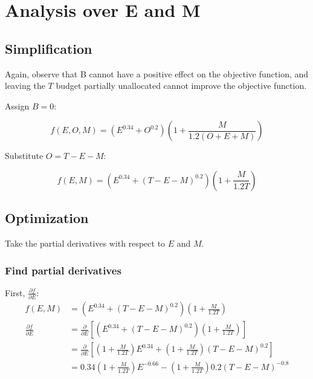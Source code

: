 \documentclass{article}
\begin{document}

\section{Analysis over E and M}

\subsection{Simplification}

Again, observe that B cannot have a positive effect on the objective function, and leaving the $T$ budget partially unallocated cannot improve the objective function.

Assign $B = 0$:

\[
f(E, O, M) = \left( E^{0.34} + O^{0.2} \right) \left( 1 + \frac{M}{1.2 \left( O + E + M \right)} \right)
\]

Substitute $O = T - E - M$:

\[
f(E, M) = \left( E^{0.34} + \left( T - E - M \right)^{0.2} \right) \left( 1 + \frac{M}{1.2 T} \right)
\]

\subsection{Optimization}

Take the partial derivatives with respect to $E$ and $M$.

\subsubsection{Find partial derivatives}

First, $\frac{\partial f}{\partial E}$:
\begin{equation}\label{eq:2dfde}
  \begin{aligned}
    f(E, M) & = \left( E^{0.34} + \left( T - E - M \right)^{0.2} \right) \left( 1 + \frac{M}{1.2 T} \right) \\
    \frac{\partial f}{\partial E} & = \frac{\partial}{\partial E}\left[\left( E^{0.34} + \left( T - E - M \right)^{0.2} \right) \left( 1 + \frac{M}{1.2 T} \right)\right] \\
    & = \frac{\partial}{\partial E}\left[
      \left( 1 + \frac{M}{1.2 T} \right) E^{0.34} + \left( 1 + \frac{M}{1.2 T} \right) \left( T - E - M \right)^{0.2}
    \right] \\
    & = 0.34\left( 1 + \frac{M}{1.2 T} \right)E^{-0.66} - \left( 1 + \frac{M}{1.2 T} \right)0.2\left( T - E - M \right)^{-0.8} \\
  \end{aligned}
\end{equation}
\end{document}

